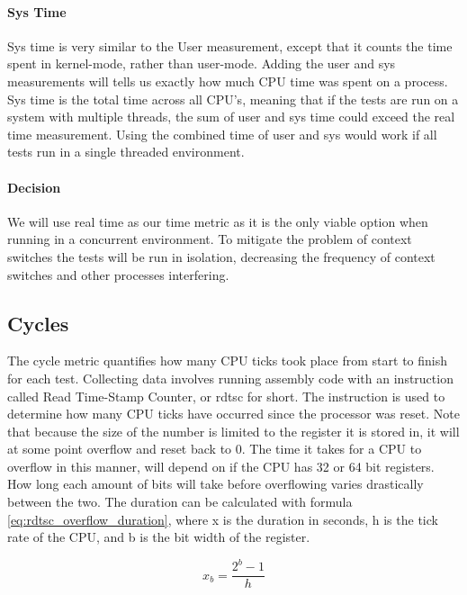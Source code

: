 \paragraph{Sys Time}
Sys time is very similar to the User measurement, except that it counts the time spent in kernel-mode, rather than user-mode.
Adding the user and sys measurements will tells us exactly how much CPU time was spent on a process.
Sys time is the total time across all CPU's, meaning that if the tests are run on a system with multiple threads, the sum of user and sys time could exceed the real time measurement.
Using the combined time of user and sys would work if all tests run in a single threaded environment.

\paragraph{Decision}
We will use real time as our time metric as it is the only viable option when running in a concurrent environment.
To mitigate the problem of context switches the tests will be run in isolation, decreasing the frequency of context switches and other processes interfering.

\subsection{Cycles}
The cycle metric quantifies how many CPU ticks took place from start to finish for each test.
Collecting data involves running assembly code with an instruction called Read Time-Stamp Counter, or rdtsc for short\cite{stack_overflow_rdtcs}.
The instruction is used to determine how many CPU ticks have occurred since the processor was reset.
Note that because the size of the number is limited to the register it is stored in, it will at some point overflow and reset back to 0.
The time it takes for a CPU to overflow in this manner, will depend on if the CPU has 32 or 64 bit registers.
How long each amount of bits will take before overflowing varies drastically between the two.
The duration can be calculated with formula \ref{eq:rdtsc_overflow_duration}, where x is the duration in seconds, h is the tick rate of the CPU, and b is the bit width of the register.

\begin{equation}\label{eq:rdtsc_overflow_duration}
x_b = \frac{2^b - 1}{h}
\end{equation}

\bigskip


